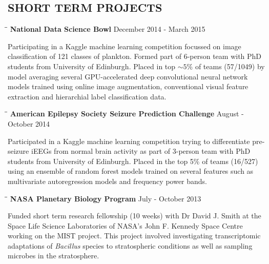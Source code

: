 \documentclass{res}
\begin{document}
\begin{resume}
\section{SHORT TERM PROJECTS}

   \vspace{-0.05in} 

   \begin{tabbing}
   \hspace{2in}\= \hspace{2.6in}\= \kill 
   {\bf National Data Science Bowl} \> \>        December 2014 - March 2015\\
     \end{tabbing}\vspace{-20pt}      
     Participating in a Kaggle machine learning competition focussed on image classification of 121 classes of plankton. Formed part of 6-person team with PhD students from University of Edinburgh. 
     Placed in top $\sim5\%$ of teams (57/1049) by model averaging several GPU-accelerated deep convolutional neural network models trained using online image augmentation, conventional visual feature extraction and hierarchial label classification data.
     
   \vspace{-0.1in} 
   \begin{tabbing}
   \hspace{2in}\= \hspace{2.6in}\= \kill 
   {\bf American Epilepsy Society Seizure Prediction Challenge} \> \>        August - October 2014\\
     \end{tabbing}\vspace{-20pt}      
     Participated in a Kaggle machine learning competition trying to differentiate pre-seizure iEEGs from normal brain activity as part of 3-person team with PhD students from University of Edinburgh. 
     Placed in the top 5\% of teams (16/527) using an ensemble of random forest models trained on several features such as multivariate autoregression models and frequency power bands.

   \vspace{-0.1in} 
   \begin{tabbing}
   \hspace{2in}\= \hspace{2.6in}\= \kill 
    {\bf NASA Planetary Biology Program} \> \>        July - October 2013\\
     \end{tabbing}\vspace{-20pt}      
     Funded short term research fellowship (10 weeks) with Dr David J. Smith at the Space Life Science Laboratories of NASA's John F. Kennedy Space Centre working on the MIST project. This project involved investigating transcriptomic adaptations of \textit{Bacillus} species to stratospheric conditions as well as sampling microbes in the stratosphere.


\end{resume}
\end{document}
